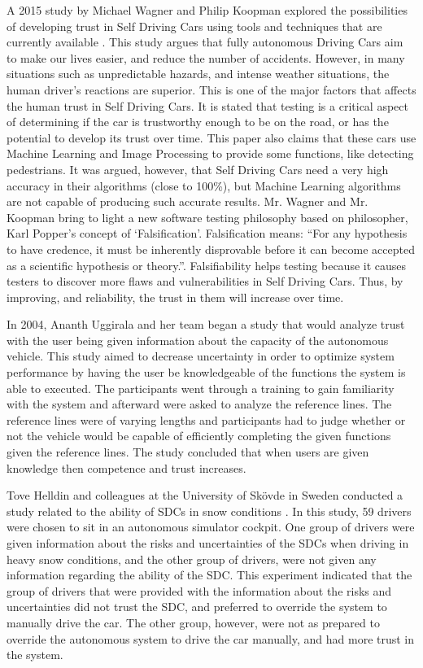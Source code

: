 \documentclass[runningheads,a4paper]{llncs}
\begin{document}
A 2015 study by Michael Wagner and Philip Koopman explored the possibilities of developing trust in Self Driving Cars using tools and techniques that are currently available \cite{wagner2015philosophy}. This study argues that fully autonomous Driving Cars aim to make our lives easier, and reduce the number of accidents. However, in many situations such as unpredictable hazards, and intense weather situations, the human driver's reactions are superior. This is one of the major factors that affects the human trust in Self Driving Cars. It is stated that testing is a critical aspect of determining if the car is trustworthy enough to be on the road, or has the potential to develop its trust over time. This paper also claims that these cars use Machine Learning and Image Processing to provide some functions, like detecting pedestrians. It was argued, however, that Self Driving Cars need a very high accuracy in their algorithms (close to 100\%), but Machine Learning algorithms are not capable of producing such accurate results. Mr. Wagner and Mr. Koopman bring to light a new software testing philosophy based on philosopher, Karl Popper's concept of `Falsification'. Falsification means: ``For any hypothesis to have credence, it must be inherently disprovable before it can become accepted as a scientific hypothesis or theory.''\cite{falsifiability}. Falsifiability helps testing because it causes testers to discover more flaws and vulnerabilities in Self Driving Cars. Thus, by improving, and reliability, the trust in them will increase over time.

In 2004, Ananth Uggirala and her team began a study that would analyze trust with the user being given information about the capacity of the autonomous vehicle\cite{uggirala2004measurement}.  This study aimed to decrease uncertainty in order to optimize system performance by having the user be knowledgeable of the functions the system is able to executed.   The participants went through a training to gain familiarity with the system and afterward were asked to analyze the reference lines.  The reference lines were of varying lengths and participants had to judge whether or not the vehicle would be capable of efficiently completing the given functions given the reference lines.  The study concluded that when users are given knowledge then competence and trust increases.

Tove Helldin and colleagues at the University of Skövde in Sweden conducted a study related to the ability of SDCs in snow conditions \cite{helldin2013presenting}. In this study, 59 drivers were chosen to sit in an autonomous simulator cockpit. One group of drivers were given information about the risks and uncertainties of the SDCs when driving in heavy snow conditions, and the other group of drivers, were not given any information regarding the ability of the SDC. This experiment indicated that the group of drivers that were provided with the information about the risks and uncertainties did not trust the SDC, and preferred to override the system to manually drive the car. The other group, however, were not as prepared to override the autonomous system to drive the car manually, and had more trust in the system.
\end{document}

